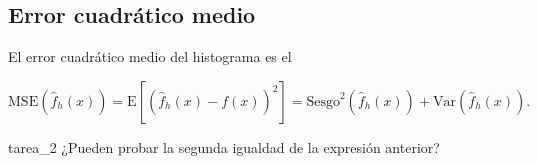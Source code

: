 \documentclass[12pt]{book}\usepackage[]{graphicx}\usepackage[]{color}
\theoremstyle{definition}
\theoremstyle{plain}
\begin{document}
\subsection{Error cuadrático medio}

El error cuadrático medio del histograma es el

\begin{equation*}
	\mathrm{MSE}\left( \hat{f}_h(x)\right) =
	\mathrm{E}\left[\left(\hat{f}_h(x) - f(x)\right)^2\right] = \mathrm{Sesgo}^2\left( \hat{f}_h(x)\right) + \mathrm{Var}\left( \hat{f}_h(x)\right).
\end{equation*}

\begin{tarea}{}{tarea_2}
	¿Pueden probar la segunda igualdad de la expresión anterior?
\end{tarea}
\end{document}
